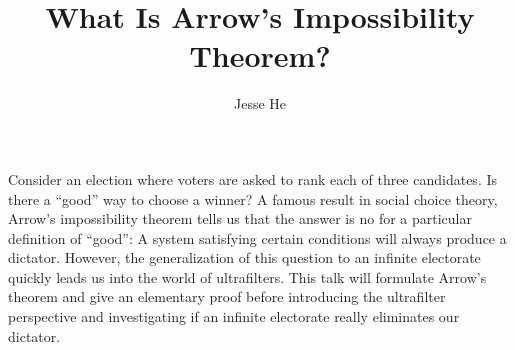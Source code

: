 \documentclass{amsart}
\title{What Is Arrow's Impossibility Theorem?}
\author{Jesse He}
\begin{document}
\maketitle

Consider an election where voters are asked to rank each of three candidates. Is there a ``good'' way to choose a winner?
A famous result in social choice theory, Arrow's impossibility theorem tells us that the answer is no for a particular
definition of ``good'': A system satisfying certain conditions will always produce a dictator. However, the generalization
of this question to an infinite electorate quickly leads us into the world of ultrafilters.
This talk will formulate Arrow's theorem and give an elementary proof before introducing the ultrafilter perspective
and investigating if an infinite electorate really eliminates our dictator.
\end{document}
